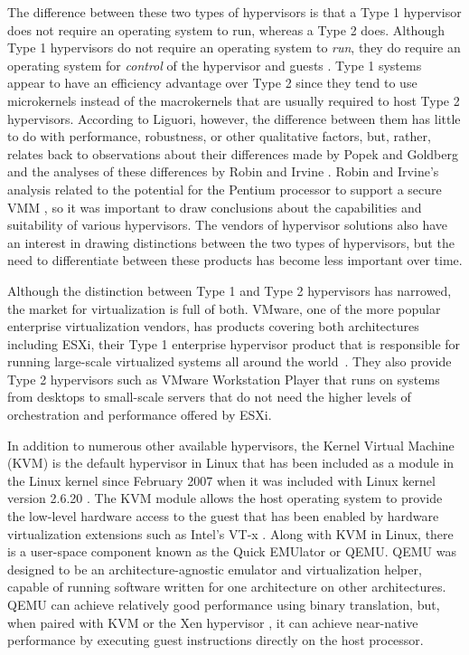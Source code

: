 The difference between these two types of hypervisors is that a Type 1 hypervisor does not require an operating system to run, whereas a Type 2 does.
Although Type 1 hypervisors do not require an operating system to \emph{run}, they do require an operating system for \emph{control} of the hypervisor and guests \autocite{liguoriMyth}.
Type 1 systems appear to have an efficiency advantage over Type 2 since they tend to use microkernels instead of the macrokernels that are usually required to host Type 2 hypervisors.
According to Liguori, however, the difference between them has little to do with performance, robustness, or other qualitative factors, but, rather, relates back to  observations about their differences made by Popek and Goldberg \autocite{popek1974formal} and the analyses of these differences by Robin and Irvine \autocite{_robin_1}.
Robin and Irvine's analysis related to the potential for the Pentium processor to support a secure VMM \autocite{_robin_1}, so it was important to draw conclusions about the capabilities and suitability of various hypervisors.
The vendors of hypervisor solutions also have an interest in drawing distinctions between the two types of hypervisors, but the need to differentiate between these products has become less important over time.  

Although the distinction between Type 1 and Type 2 hypervisors has narrowed, the market for virtualization is full of both.
VMware, one of the more popular enterprise virtualization vendors, has products covering both architectures including ESXi, their Type 1 enterprise hypervisor product that is responsible for running large-scale virtualized systems all around the world~\autocite{vmwareProducts}.
They also provide Type 2 hypervisors such as VMware Workstation Player that runs on systems from desktops to small-scale servers that do not need the higher levels of orchestration and performance offered by ESXi.

In addition to numerous other available hypervisors, the Kernel Virtual Machine (KVM) is the default hypervisor in Linux that has been included as a module in the Linux kernel since February 2007 when it was included with Linux kernel version 2.6.20 \autocite{_kvm_1}.
The KVM module allows the host operating system to provide the low-level hardware access to the guest that has been enabled by hardware virtualization extensions such as Intel's VT-x \autocite{_grinberg_1}.
Along with KVM in Linux, there is a user-space component known as the Quick EMUlator or QEMU\autocite{_qemu_1}.
QEMU was designed to be an architecture-agnostic emulator and virtualization helper, capable of running software written for one architecture on other architectures.
QEMU can achieve relatively good performance using binary translation, but, when paired with KVM or the Xen hypervisor \autocite{_barham_1}, it can achieve near-native performance by executing guest instructions directly on the host processor.

